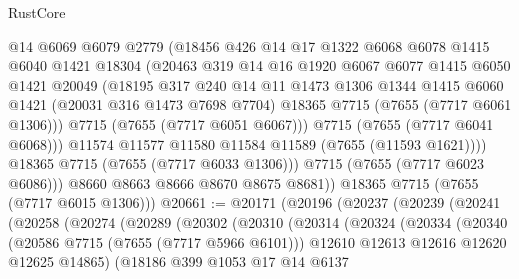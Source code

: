 \begin{lexlean}{RustCore}
\begin{coremodule}
                  @14
                  @6069
                  @6079
                  @2779
                  (@18456
                    @426
                    @14
                    @17
                    @1322
                    @6068
                    @6078
                    @1415
                    @6040
                    @1421
                    @18304
                    (@20463
                      @319
                      @14
                      @16
                      @1920
                      @6067
                      @6077
                      @1415
                      @6050
                      @1421
                      @20049
                      (@18195
                        @317
                        @240
                        @14
                        @11
                        @1473
                        @1306
                        @1344
                        @1415
                        @6060
                        @1421
                        (@20031 @316 @1473 @7698 @7704)
                        @18365
                        @7715
                        (@7655 (@7717 @6061 @1306)))
                      @7715
                      (@7655 (@7717 @6051 @6067)))
                    @7715
                    (@7655 (@7717 @6041 @6068)))
                  @11574
                  @11577
                  @11580
                  @11584
                  @11589
                  (@7655 (@11593 @1621))))
              @18365
              @7715
              (@7655 (@7717 @6033 @1306)))
            @7715
            (@7655 (@7717 @6023 @6086)))
          @8660
          @8663
          @8666
          @8670
          @8675
          @8681))
      @18365
      @7715
      (@7655 (@7717 @6015 @1306)))
@20661 := @20171
    (@20196
      (@20237
        (@20239
          (@20241
            (@20258
              (@20274
                (@20289
                  (@20302
                    (@20310
                      (@20314
                        (@20324
                          (@20334
                            (@20340
                              (@20586 @7715 (@7655 (@7717 @5966 @6101)))
                              @12610
                              @12613
                              @12616
                              @12620
                              @12625
                              @14865)
                            (@18186
                              @399
                              @1053
                              @17
                              @14
                              @6137

\end{coremodule}
\end{lexlean}
